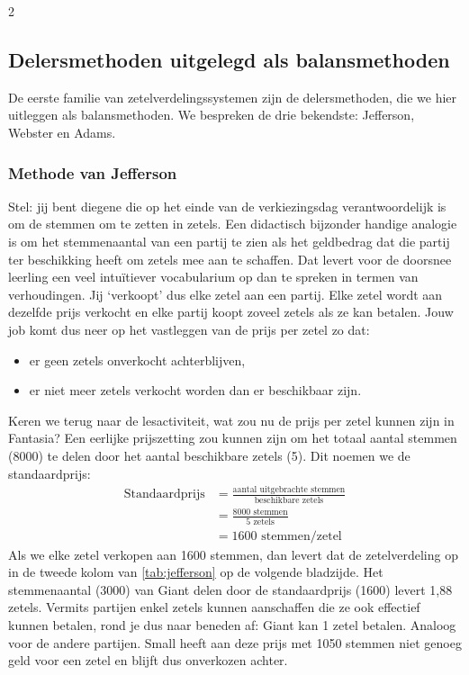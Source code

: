\begin{multicols}{2}
\subsection{Delersmethoden uitgelegd als balansmethoden}
De eerste familie van zetelverdelingssystemen zijn de delersmethoden, die we hier uitleggen als balansmethoden. We bespreken de drie bekendste: Jefferson, Webster en Adams.
\subsubsection{Methode van Jefferson}
Stel: jij bent diegene die op het einde van de verkiezingsdag verantwoordelijk is om de stemmen om te zetten in zetels. Een didactisch bijzonder handige analogie is om het stemmenaantal van een partij te zien als het geldbedrag dat die partij ter beschikking heeft om zetels mee aan te schaffen. Dat levert voor de doorsnee leerling een veel intuïtiever vocabularium op dan te spreken in termen van verhoudingen. Jij `verkoopt' dus elke zetel aan een partij. Elke zetel wordt aan dezelfde prijs verkocht en elke partij koopt zoveel zetels als ze kan betalen. Jouw job komt dus neer op het vastleggen van de prijs per zetel zo dat:
\begin{itemize}
    \item er geen zetels onverkocht achterblijven,
    \item er niet meer zetels verkocht worden dan er beschikbaar zijn.
\end{itemize}
Keren we terug naar de lesactiviteit, wat zou nu de prijs per zetel kunnen zijn in Fantasia? Een eerlijke prijszetting zou kunnen zijn om het totaal aantal stemmen (8000) te delen door het aantal beschikbare zetels (5). Dit noemen we de standaardprijs:
\begin{align*}
    \text{Standaardprijs}  &= \frac{\text{aantal uitgebrachte stemmen}}{\text{beschikbare zetels}}\\
    &= \frac{8000 \text{ stemmen}}{5 \text{ zetels}}\\
    &= 1600 \text{ stemmen/zetel}
\end{align*}
Als we elke zetel verkopen aan 1600 stemmen, dan levert dat de zetelverdeling op in de tweede kolom van \autoref{tab:jefferson} op de volgende bladzijde. Het stemmenaantal (3000) van Giant delen door de standaardprijs (1600) levert 1,88 zetels. Vermits partijen enkel zetels kunnen aanschaffen die ze ook effectief kunnen betalen, rond je dus naar beneden af: Giant kan 1 zetel betalen. Analoog voor de andere partijen. Small heeft aan deze prijs met 1050 stemmen niet genoeg geld voor een zetel en blijft dus onverkozen achter. 


\end{multicols}
